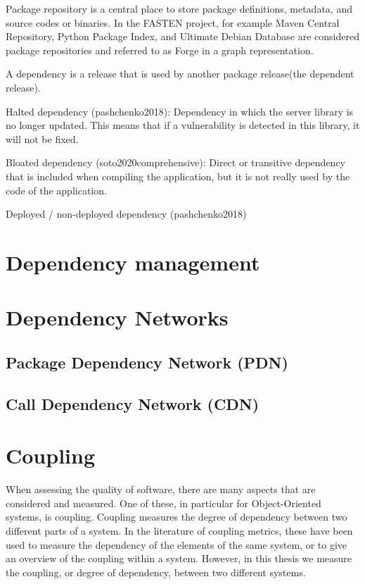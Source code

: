 Package repository is a central place to store package definitions, metadata, and source codes or binaries. In the FASTEN project, for example Maven Central Repository, Python Package Index, and Ultimate Debian Database are considered package repositories and referred to as Forge in a graph representation.

A dependency is a release that is used by another package release(the dependent release).

\blankl
Halted dependency (pashchenko2018): Dependency in which the server library is no longer updated. This means that if a vulnerability is detected in this library, it will not be fixed.

\blankl
Bloated dependency (soto2020comprehensive): Direct or transitive dependency that is included when compiling the application, but it is not really used by the code of the application.

\blankl
Deployed / non-deployed dependency (pashchenko2018)

\reminder{}

\section{Dependency management}

\section{Dependency Networks}
\subsection{Package Dependency Network (PDN)}
\subsection{Call Dependency Network (CDN)}

\section{Coupling}
When assessing the quality of software, there are many aspects that are considered and measured. One of these, in particular for Object-Oriented systems, is coupling. Coupling measures the degree of dependency between two different parts of a system. In the literature of coupling metrics, these have been used to measure the dependency of the elements of the same system, or to give an overview of the coupling within a system. However, in this thesis we measure the coupling, or degree of dependency, between two different systems.

